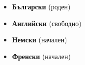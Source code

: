 
\begin{itemize}[leftmargin=1.2em, itemsep=2pt]
	\item \textbf{Български} (роден)
	\item \textbf{Английски} (свободно)
	\item \textbf{Немски} (начален)
	\item \textbf{Френски} (начален)
\end{itemize}
